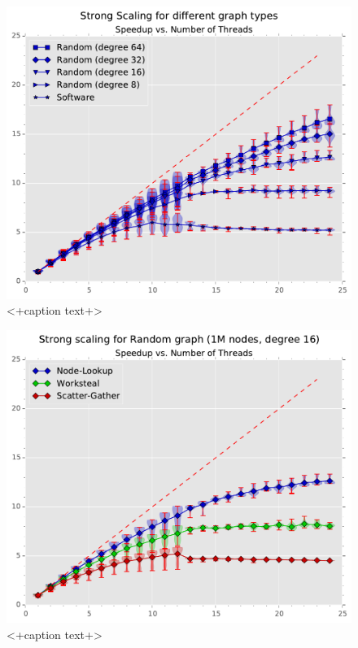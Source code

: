 \begin{figure}[ht]
	\centering
	\includegraphics[width=\columnwidth]{plots/strongscaling_gtALL_n1000000.pdf}
	\caption{<+caption text+>}
	\label{fig:strongscaling_graphtypes}
\end{figure}
 
\begin{figure}[ht]
	\centering
	\includegraphics[width=\columnwidth]{plots/strongscaling_gtRANDOMLIN_n1000000_deg16.pdf}
	\caption{<+caption text+>}
	\label{fig:<+label+>}
\end{figure}
 
